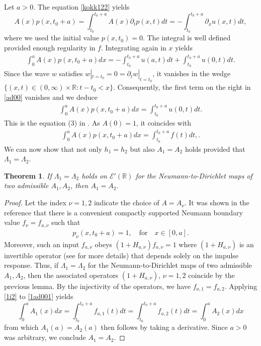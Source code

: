 \documentclass[10pt,a4paper]{article}
\theoremstyle{plain}
\newtheorem{theorem}{Theorem}[section]
\theoremstyle{definition}
\theoremstyle{remark}
\numberwithin{equation}{section}
\newcommand{\R}{\mathbb{R}}
\begin{document}
Let $a>0$. 
The equation \eqref{kokk122} yields 
\[
  A(x)  p (x,t_0 + a)  = \int_{t_0}^{t_0 + a}  A(x) \partial_t p (x,t) dt =    -   \int_{t_0}^{t_0 + a}  \partial_x u(x,t) dt ,
\]
where we used the initial value  $p(x,t_0) = 0$. 
The integral is well defined provided enough regularity in $f$. 
Integrating again in $x$ yields 
\begin{align}
\int_0^a  A(x)  p (x,t_0 + a) dx  =   -   \int_{t_0}^{t_0 + a}   u(a,t) dt   +  \int_{t_0}^{t_0 + a}  u(0,t) dt .\label{ad00}
\end{align}
Since the wave $w$ satisfies $w|_{t = t_0} = 0 = \partial_t w|_{t = t_0}$, it vanishes in the wedge $\{ (x,t) \in (0,\infty) \times \R : t -t_0 < x \}$.      
Consequently, the first term on the right in \eqref{ad00} vanishes and we deduce 
\begin{align}
\int_0^a  A(x)  p (x,t_0 + a) dx  =    \int_{t_0}^{t_0 + a}  u(0,t) dt .\label{1ad00}
\end{align}
This is the equation (3) in  \cite{sondhi_gopinath}. 
As $A(0) = 1$, it coincides with 
\begin{align}
\int_0^a  A(x)  p (x,t_0 + a) dx  =    \int_{t_0}^{t_0 + a}   f(t)  dt ,\label{1ad001}.
\end{align}
We can now show that not only $h_1 = h_2$ but also $A_1 = A_2$ holds provided that $\Lambda_{1} = \Lambda_{2}$. 
\begin{theorem}\label{sondhi_theorem}
If $\Lambda_{1} = \Lambda_{2}$ holds on $\mathcal{E}'(\R)$ for the Neumann-to-Dirichlet maps of two admissible $A_1,A_2$, then $A_1 = A_2$. 
\end{theorem}
\begin{proof}
Let the index $\nu = 1,2$ indicate the choice of $A = A_\nu$.  
It was shown in the reference that there is a convenient compactly supported Neumann boundary value $f_{\nu}=f_{a,\nu}$  such that 
\begin{align}
p_\nu (x,t_0 +a) =1, \quad  \text{for}  \quad  x \in [0,a]. \label{1i2}
\end{align} 
Moreover, such an input $f_{a,\nu}$ obeys $(1+H_{a, \nu}) f_{a,\nu} =  1$ where $(1+H_{a,\nu})$ is an invertible operator (see \cite[Appendix A]{sondhi_gopinath} for more details) that depends solely on the impulse response. 
Thus, if $\Lambda_{1} = \Lambda_{2}$ for the Neumann-to-Dirichlet maps of two admissible $A_1,A_2$, then the associated operators 
$(1+H_{a,\nu}) $, $\nu = 1,2$ coincide by the previous lemma. By the injectivity of the operators, we have $f_{a,1}= f_{a,2}$.  
Applying \eqref{1i2} to  \eqref{1ad001} yields
\[
\int_0^a  A_1(x) dx   =  \int_{t_0}^{t_0 + a}   f_{a,1}(t)  dt =  \int_{t_0}^{t_0 + a}   f_{a,2}(t)  dt  = \int_0^a  A_2(x) dx
\]
 from which $A_1 (a) = A_2(a)$ then follows by taking a derivative. Since $a>0$ was arbitrary, we conclude $A_1 = A_2$.
\end{proof}





\printbibliography
\end{document}

